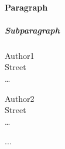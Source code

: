 \documentclass{salt}
\begin{document}
\paragraph{Paragraph}

\subparagraph{Subparagraph}





\begin{addresses}
  \begin{address}
    Author1 \\
    Street \\
    \ldots \\
  \end{address}
  \begin{address}
    Author2 \\
    Street \\
    \ldots \\
  \end{address}
  ...
\end{addresses}

\end{document}

